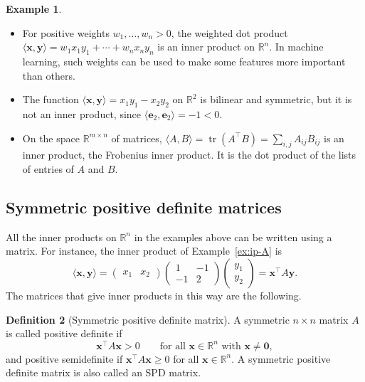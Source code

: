 \documentclass[11pt]{article}
\newcommand{\ip}[2]{\langle #1, #2 \rangle}
\theoremstyle{definition}
\newtheorem{definition}{Definition}[section]
\newtheorem{example}[definition]{Example}
\theoremstyle{plain}
\theoremstyle{remark}
\DeclareMathOperator{\tr}{tr}
\begin{document}
\begin{example}
    \begin{itemize}
        \item For positive weights $w_1, \ldots, w_n > 0$, the weighted dot product $\ip{\mathbf{x}}{\mathbf{y}} = w_1 x_1 y_1 + \cdots + w_n x_n y_n$ is an inner product on $\mathbb{R}^n$. In machine learning, such weights can be used to make some features more important than others.
        \item The function $\ip{\mathbf{x}}{\mathbf{y}} = x_1 y_1 - x_2 y_2$ on $\mathbb{R}^2$ is bilinear and symmetric, but it is not an inner product, since $\ip{\mathbf{e}_2}{\mathbf{e}_2} = -1 < 0$.
        \item On the space $\mathbb{R}^{m \times n}$ of matrices, $\ip{A}{B} = \tr(A^\top B) = \sum_{i, j} A_{ij} B_{ij}$ is an inner product, the Frobenius inner product. It is the dot product of the lists of entries of $A$ and $B$.
    \end{itemize}
\end{example}

\subsection{Symmetric positive definite matrices}

All the inner products on $\mathbb{R}^n$ in the examples above can be written using a matrix. For instance, the inner product of Example~\ref{ex:ip-A} is
\[\ip{\mathbf{x}}{\mathbf{y}} = \begin{pmatrix} x_1 & x_2 \end{pmatrix} \begin{pmatrix} 1 & -1 \\ -1 & 2 \end{pmatrix} \begin{pmatrix} y_1 \\ y_2 \end{pmatrix} = \mathbf{x}^\top A \mathbf{y}.\]
The matrices that give inner products in this way are the following.

\begin{definition}[Symmetric positive definite matrix]\label{def:spd}
    A symmetric $n \times n$ matrix $A$ is called positive definite if
    \[\mathbf{x}^\top A \mathbf{x} > 0 \qquad \text{for all } \mathbf{x} \in \mathbb{R}^n \text{ with } \mathbf{x} \neq \mathbf{0},\]
    and positive semidefinite if $\mathbf{x}^\top A \mathbf{x} \geq 0$ for all $\mathbf{x} \in \mathbb{R}^n$. A symmetric positive definite matrix is also called an SPD matrix.
\end{definition}
\end{document}
